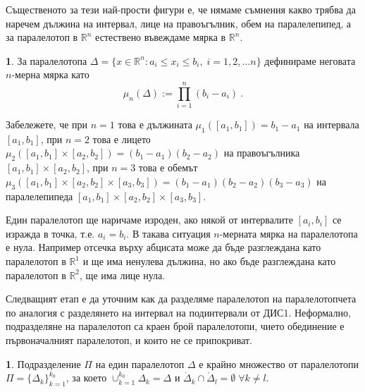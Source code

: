 \documentclass[11pt]{article}
\numberwithin{equation}{section}
\numberwithin{figure}{section}
\numberwithin{table}{section}
\theoremstyle{plain}
\theoremstyle{definition}
\newtheorem{defn}[thm]{\protect\definitionname}
\theoremstyle{remark}
\theoremstyle{definition}
\theoremstyle{remark}
\theoremstyle{plain}
\theoremstyle{definition}
\theoremstyle{definition}
\theoremstyle{plain}
\theoremstyle{plain}
\theoremstyle{plain}
\theoremstyle{definition}
\theoremstyle{plain}
\providecommand{\definitionname}{Дефиниция}
\newcommand*{\R}{\mathbb{R}}
\begin{document}
Същественото за тези най-прости фигури е, че нямаме съмнения какво трябва да наречем дължина на интервал, лице на правоъгълник, обем на паралелепипед, а за паралелотоп в $\R^n$ естествено въвеждаме мярка в $\R^n$.

\begin{defn}
За паралелотопа $\Delta = \{x\in\R^n : a_i \leq x_i \leq b_i,\; i = 1, 2, ... n \}$ дефинираме неговата $n$-мерна мярка като
$$\mu_n(\Delta) := \prod_{i=1}^n (b_i - a_i) \ .$$
\end{defn}

Забележете, че при $n=1$ това е дължината $\mu_1([a_1,b_1]) = b_1 - a_1$ на интервала $[a_1,b_1]$, при $n=2$ това е лицето $\mu_2([a_1,b_1]\times [a_2,b_2]) = (b_1 - a_1)(b_2-a_2)$ на правоъгълника $[a_1, b_1]\times[a_2, b_2]$, при $n=3$ това е обемът $\mu_3([a_1, b_1]\times[a_2, b_2]\times[a_3, b_3]) = (b_1 - a_1)(b_2-a_2)(b_3-a_3)$ на паралелепипеда $[a_1, b_1]\times[a_2, b_2]\times[a_3, b_3]$.

Един паралелотоп ще наричаме изроден, ако някой от интервалите $[a_i, b_i]$ се изражда в точка, т.е. $a_i=b_i$. В такава ситуация $n$-мерната мярка на паралелотопа е нула. Например отсечка върху абцисата може да бъде разглеждана като паралелотоп в $\R^1$ и ще има ненулева дължина, но ако бъде разглеждана като паралелотоп в $\R^2$, ще има лице нула.


\bigskip

Следващият етап е да уточним как да разделяме паралелотоп на паралелотопчета по аналогия с разделянето на интервал на подинтервали от ДИС1. Неформално, подразделяне на паралелотоп са краен брой паралелотопи, чието обединение е първоначалният паралелотоп, и които не се припокриват.

\begin{defn}
Подразделение $\Pi$ на един паралелотоп $\Delta$ е крайно множество от паралелотопи
$\Pi = \{\Delta_k \}_{k=1}^{k_0}$, за което
 $\cup_{k=1}^{k_0} \Delta_k = \Delta$ и $\mathring \Delta_{k} \cap \mathring \Delta_{l} = \emptyset \; \forall k \neq l$.
\end{defn}

\begin{center}
\end{center}
\end{document}
